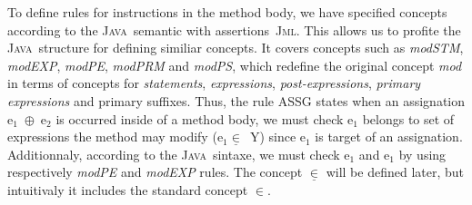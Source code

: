 \documentclass[a4paper]{llncs}
\newcommand{\jml}{\textsc{Jml}}
\newcommand{\java}{\textsc{Java}}
\begin{document}
To define rules for instructions in the method body, we have specified
concepts according to the \java~semantic with assertions~\jml. This
allows us to profite the \java~structure for defining similiar
concepts. It covers concepts such as \textit{modSTM},
\textit{modEXP}, \textit{modPE}, \textit{modPRM} and \textit{modPS},
which redefine the original concept \textit{mod} in terms of concepts
for \emph{statements}, \emph{expressions}, \emph{post-expressions},
\emph{primary expressions} and {primary suffixes}. Thus, the rule
\textsc{ASSG} states when an assignation \textup{e}$_1$\ $\oplus$\
\textup{e}$_2$ is occurred inside of a method body, we must check
\textup{e}$_1$ belongs to set of expressions the method may modify
(\textup{e}$_1\underline{\in}$\ \textsc{Y}) since \textup{e}$_1$ is
target of an assignation. Additionnaly, according to the
\java~sintaxe, we must check \textup{e}$_1$ and \textup{e}$_1$ by
using respectively \textit{modPE} and \textit{modEXP} rules. The
concept $\underline{\in}$ will be defined later, but intuitivaly it
includes the standard concept $\in$.
\end{document}
